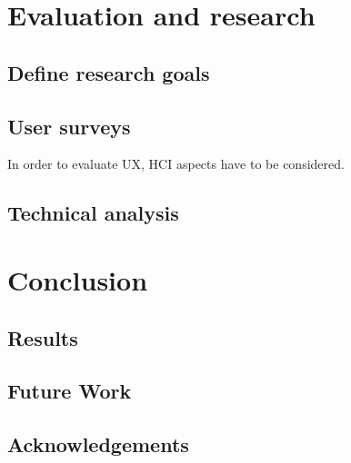 \documentclass[titlepage, a4paper, 11pt]{scrartcl}
\begin{document}
    \section{Evaluation and research}

        \subsection{Define research goals}

        \subsection{User surveys}

            In order to evaluate UX, HCI aspects have to be considered.

        \subsection{Technical analysis}

    \section{Conclusion}

        \subsection{Results}

        \subsection{Future Work}

        \subsection{Acknowledgements}

     
    
\end{document}
